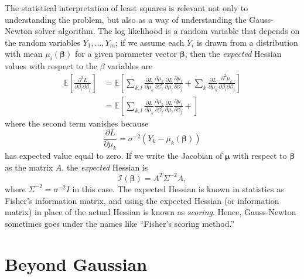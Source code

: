 \documentclass[12pt, leqno]{article} %
\newcommand{\bfmu}{\boldsymbol{\mu}}
\newcommand{\bfbeta}{\boldsymbol{\beta}}
\begin{document}
The statistical interpretation of least squares is relevant not only
to understanding the problem, but also as a way of understanding the
Gauss-Newton solver algorithm.  The log likelihood is a random
variable that depends on the random variables $Y_1, \ldots, Y_m$;
if we assume each $Y_i$ is drawn from a distribution with mean
$\mu_i(\bfbeta)$ for a given parameter vector $\bfbeta$, then the
{\em expected} Hessian values with respect to the $\beta$ variables
are
\begin{align*}
  \mathbb{E}\left[
    \frac{\partial^2 L}{\partial \beta_i \partial \beta_j}
  \right] &= 
  \mathbb{E} \left[
    \sum_{k,l}
    \frac{\partial L}{\partial \mu_k} \frac{\partial \mu_k}{\partial \beta_i}
    \frac{\partial L}{\partial \mu_l} \frac{\partial \mu_l}{\partial \beta_j} +
    \sum_k \frac{\partial L}{\partial \mu_k}
    \frac{\partial^2 \mu_k}{\partial \beta_i \partial \beta_j}
  \right] \\
  &= 
  \mathbb{E} \left[
    \sum_{k,l}
    \frac{\partial L}{\partial \mu_k} \frac{\partial \mu_k}{\partial \beta_i}
    \frac{\partial L}{\partial \mu_l} \frac{\partial \mu_l}{\partial \beta_j} +
  \right]
\end{align*}
where the second term vanishes because
\[
  \frac{\partial L}{\partial \mu_k} =
  \sigma^{-2} (Y_k-\mu_k(\bfbeta))
\]
has expected value equal to zero.
If we write the Jacobian of $\bfmu$ with respect to $\bfbeta$ as the
matrix $A$, the {\em expected} Hessian is
\[
  \mathcal{I}(\bfbeta) = A^T \Sigma^{-2} A,
\]
where $\Sigma^{-2} = \sigma^{-2} I$ in this case.  The expected
Hessian is known in statistics as Fisher's information matrix,
and using the expected Hessian (or information matrix)
in place of the actual Hessian is known as {\em scoring}.
Hence, Gauss-Newton sometimes goes under the names like
``Fisher's scoring method.''

\section{Beyond Gaussian}
\end{document}
